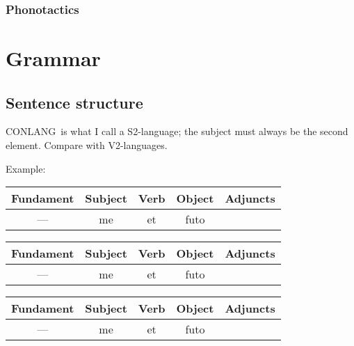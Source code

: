 \documentclass[a5paper,twoside]{book}
\newcommand{\name}{CONLANG}
\begin{document}
\section{Phonotactics}

\part{Grammar}

\newcommand{\myrepeat}[2]{
\ExplSyntaxOn
    \int_new:N \count
    \int_set:Nn \count {#1}
\ExplSyntaxOff
}


\chapter{Sentence structure}

\name\ is what I call a S2-language; the subject must always be the second element.
Compare with V2-languages.\vspace{1em}

Example:

\begin{tabular}{c|c|c|c|c}
    Fundament & Subject & Verb & Object & Adjuncts\\\hline
    --- & me & et & futo \\
\end{tabular}

\begin{tabular}{c|c|c|c|c}
    Fundament & Subject & Verb & Object & Adjuncts\\\hline
    --- & me & et & futo \\
\end{tabular}

\begin{tabular}{c|c|c|c|c}
    Fundament & Subject & Verb & Object & Adjuncts\\\hline
    --- & me & et & futo \\
\end{tabular}
\end{document}
